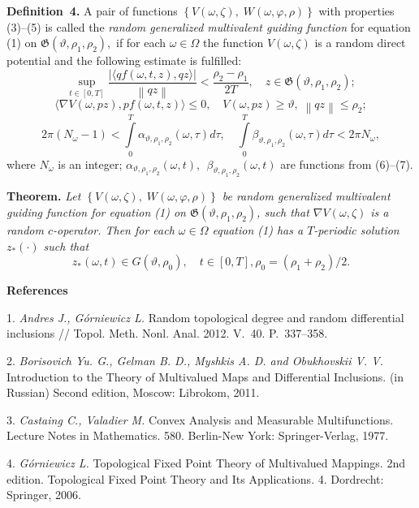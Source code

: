 \textbf{Definition~4.} A pair of functions $\left\{ {V(\omega,\zeta),\;W(\omega,\varphi,\rho )} \right\}$ with properties (3)--(5) is called the {\it random generalized multiva\-lent guiding function} for equation (1) on $\mathfrak{G}\left({\vartheta ,\rho _{1} ,\rho _{2} } \right),$ if for each $\omega\in\Omega$ the function $V(\omega,\zeta)$ is a random direct potential and the following estimate is fulfilled:
$$
\mathop {\sup}\limits_{t \in \left[ {0,T} \right]}\frac{{\left| {\langle {qf(\omega,t,z),qz} \rangle} \right|}}{{\left\|{qz} \right\|}} < \frac{{\rho _{2} - \rho _{1} }}{{2T}},\quad z\in \mathfrak{G} (\vartheta ,\rho _{1} ,\rho _{2} );
$$
$$
\langle\nabla V(\omega,pz),pf(\omega,t,z)\rangle \leqslant 0,\quad V(\omega,pz) \geqslant \vartheta ,\;\left\| {qz} \right\| \leqslant \rho _{2};
$$
$$
2\pi (N_{\omega} - 1) < \int\limits_{0}^{T} {\alpha_{\vartheta ,\rho _{1} ,\rho _{2} } (\omega,\tau )d\tau } , \quad
\int\limits_{0}^{T} {\beta _{\vartheta ,\rho _{1} ,\rho _{2} } (\omega,\tau )d\tau < 2\pi N_{\omega}},
$$
where $N_{\omega}$ is an integer; $\alpha _{\vartheta ,\rho_{1} ,\rho _{2} } (\omega,t),\,\;\beta _{\vartheta ,\rho _{1} ,\rho _{2}} (\omega,t)$ are functions from  (6)--(7).

\textbf{Theorem.} {\it
	Let $\left\{ {V(\omega,\zeta),\;W(\omega,\varphi,\rho )} \right\}$
	be random generalized multivalent guiding function for equation (1) on
	$\mathfrak{G}\left({\vartheta ,\rho _{1} ,\rho _{2} } \right)$,
	such that $\nabla V(\omega,\zeta)$ is a random $c$-operator.
	Then for each $\omega\in\Omega$ equation (1) has a $T$-periodic solution $z_{ * } ( \cdot )$  such that
}
$$
z_{ * } (\omega,t) \in G(\vartheta,\rho _{0}),\quad t \in [0,T], \rho _{0} = \left( {\rho _{1} + \rho _{2} } \right)/2.
$$
\smallskip \centerline{\bf References}\nopagebreak

1. {\it Andres J., G\'orniewicz L.} Random topological degree and random differential inclusions // Topol. Meth. Nonl. Anal. 2012. V.\, 40. P.\, 337--358.

2. {\it Borisovich Yu. G., Gelman B. D., Myshkis A. D. and Obukhovskii V. V.} Introduction to the Theory of Multivalued Maps and Differential Inclusions. (in Russian) Second edition, Moscow: Librokom, 2011.

3. {\it Castaing C., Valadier M.} Convex Analysis and Measurable Multifunctions. Lecture Notes in Mathematics. 580. Berlin-New York: Springer-Verlag, 1977.

4. {\it G\'{o}rniewicz L.} Topological Fixed Point Theory of Multi\-valued Mappings. 2nd edition. Topological Fixed Point Theory and Its Applications. 4. Dordrecht: Springer, 2006.

